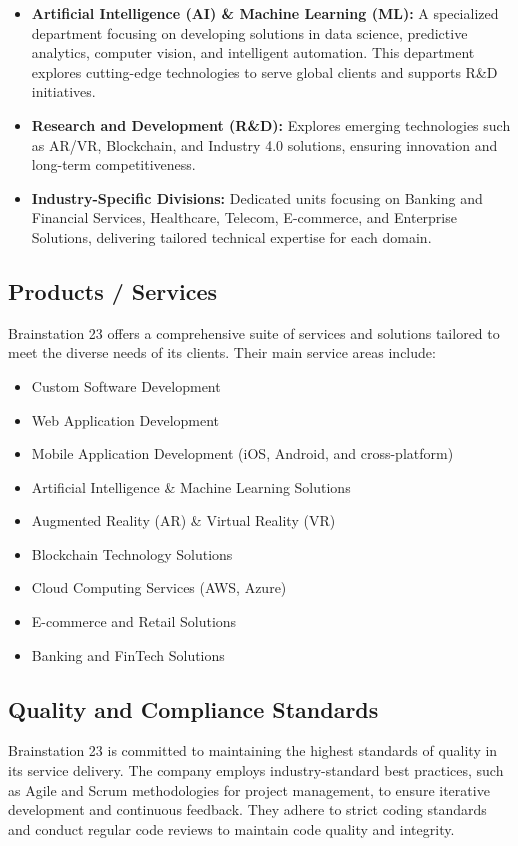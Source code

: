 \documentclass[12pt,a4paper]{article}
\begin{document}
\begin{itemize}
    \item \textbf{Artificial Intelligence (AI) \& Machine Learning (ML):} A specialized department focusing on developing solutions in data science, predictive analytics, computer vision, and intelligent automation. This department explores cutting-edge technologies to serve global clients and supports R\&D initiatives.
    
    \item \textbf{Research and Development (R\&D):} Explores emerging technologies such as AR/VR, Blockchain, and Industry 4.0 solutions, ensuring innovation and long-term competitiveness.
    
    \item \textbf{Industry-Specific Divisions:} Dedicated units focusing on Banking and Financial Services, Healthcare, Telecom, E-commerce, and Enterprise Solutions, delivering tailored technical expertise for each domain.
\end{itemize}

\subsection{Products / Services}
Brainstation 23 \citep{brainstation23} offers a comprehensive suite of services and solutions tailored to meet the diverse needs of its clients. Their main service areas include:
\begin{itemize}
    \item Custom Software Development
    \item Web Application Development
    \item Mobile Application Development (iOS, Android, and cross-platform)
    \item Artificial Intelligence \& Machine Learning Solutions
    \item Augmented Reality (AR) \& Virtual Reality (VR)
    \item Blockchain Technology Solutions
    \item Cloud Computing Services (AWS, Azure)
    \item E-commerce and Retail Solutions
    \item Banking and FinTech Solutions
\end{itemize}

\subsection{Quality and Compliance Standards}
Brainstation 23 is committed to maintaining the highest standards of quality in its service delivery. The company employs industry-standard best practices, such as Agile and Scrum methodologies for project management, to ensure iterative development and continuous feedback. They adhere to strict coding standards and conduct regular code reviews to maintain code quality and integrity.
\end{document}
